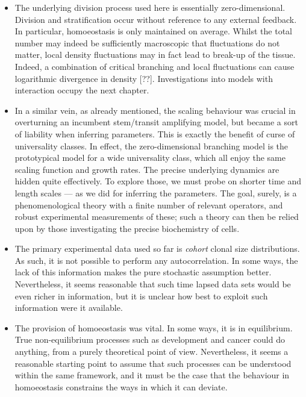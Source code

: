 \documentclass[10pt,english]{report}
\begin{document}
\begin{itemize}
\item The underlying division process used here is essentially zero-dimensional. Division and stratification occur without reference to any external feedback. In particular, homoeostasis is only maintained on average. Whilst the total number may indeed be sufficiently macroscopic that fluctuations do not matter, local density fluctuations may in fact lead to break-up of the tissue. Indeed, a combination of critical branching and local fluctuations can cause logarithmic divergence in density [??]. Investigations into models with interaction occupy the next chapter.

\item In a similar vein, as already mentioned, the scaling behaviour was crucial in overturning an incumbent stem/transit amplifying model, but became a sort of liability when inferring parameters. This is exactly the benefit of curse of universality classes. In effect, the zero-dimensional branching model is the prototypical model for a wide universality class, which all enjoy the same scaling function and growth rates. The precise underlying dynamics are hidden quite effectively. To explore those, we must probe on shorter time and length scales --- as we did for inferring the parameters. The goal, surely, is a phenomenological theory with a finite number of relevant operators, and robust experimental measurements of these; such a theory can then be relied upon by those investigating the precise biochemistry of cells.

\item The primary experimental data used so far is \emph{cohort} clonal size distributions. As such, it is not possible to perform any autocorrelation. In some ways, the lack of this information makes the pure stochastic assumption better. Nevertheless, it seems reasonable that such time lapsed data sets would be even richer in information, but it is unclear how best to exploit such information were it available.

\item The provision of homoeostasis was vital. In some ways, it is in equilibrium. True non-equilibrium processes such as development and cancer could do anything, from a purely theoretical point of view. Nevertheless, it seems a reasonable starting point to assume that such processes can be understood within the same framework, and it must be the case that the behaviour in homoeostasis constrains the ways in which it can deviate.

\end{itemize}
\end{document}
